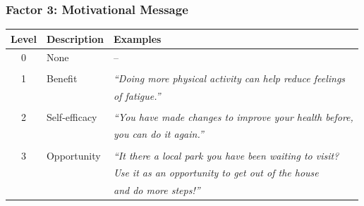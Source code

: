 \documentclass[10pt,xcolor=dvipsnames]{beamer}
\begin{document}
\begin{frame}
\frametitle{Factor 3: Motivational Message}
\begin{center}
\begin{tabular}{c|l|l}
\hline
Level & Description & Examples \\
\hline
0 & None & -- \\ 
& & \\
1 & Benefit & {\em ``Doing more physical activity can help reduce feelings}  \\
& &  {\em of fatigue.''} \\ 
& & \\
2 & Self-efficacy & {\em ``You have made changes to improve your health before,}  \\
& &  {\em you can do it again.''} \\ 
& & \\
3 & Opportunity & {\em ``It there a local park you have been waiting to visit?}  \\
&  & {\em Use it as an opportunity to get out of the house} \\
&  & {\em and do more steps!''} \\
\hline
\end{tabular}
\end{center}

\end{frame}
\end{document}
